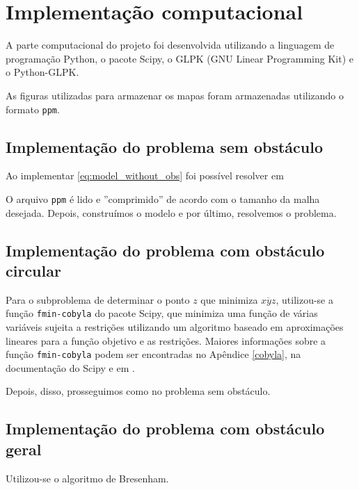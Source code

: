 %
%
%

\section{Implementa\c{c}\~{a}o computacional}
A parte computacional do projeto foi desenvolvida utilizando a linguagem de
programação Python\nocite{Python}, o pacote Scipy, o GLPK (GNU Linear
Programming Kit)\nocite{GLPK} e o Python-GLPK.

As figuras utilizadas para armazenar os mapas foram armazenadas
utilizando o formato \texttt{ppm}.

\subsection{Implementação do problema sem obstáculo}
Ao implementar \eqref{eq:model_without_obs} foi possível resolver em

O arquivo \texttt{ppm} é lido e ''comprimido'' de acordo com o tamanho da malha
desejada. Depois, construímos o modelo e por último, resolvemos o problema.

\subsection{Implementação do problema com obstáculo circular}
Para o subproblema de determinar o ponto $z$ que minimiza $\overline{xyz}$,
utilizou-se a função \texttt{fmin-cobyla} do pacote Scipy, que minimiza uma
função de várias variáveis sujeita a restrições utilizando um algoritmo baseado
em aproximações lineares para a função objetivo e as restrições. Maiores
informações sobre a função \texttt{fmin-cobyla} podem ser encontradas no
Apêndice \ref{cobyla}, na documentação do Scipy e em \cite{Powell:2007}.

Depois, disso, prosseguimos como no problema sem obstáculo.

\subsection{Implementação do problema com obstáculo geral}
Utilizou-se o algoritmo de Bresenham.

